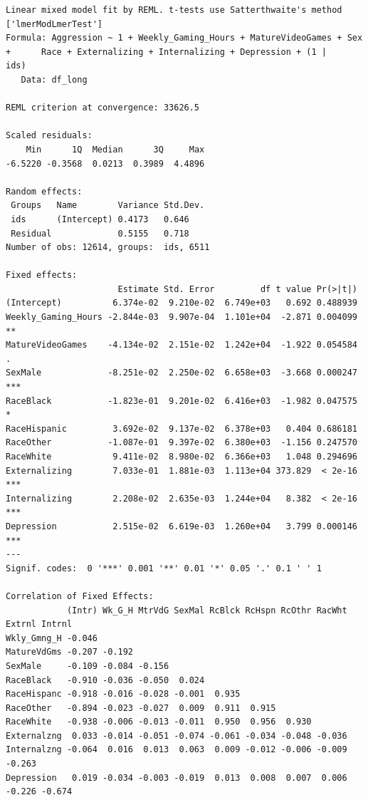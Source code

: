 \documentclass{article}
\begin{document}
\begin{verbatim}
Linear mixed model fit by REML. t-tests use Satterthwaite's method ['lmerModLmerTest']
Formula: Aggression ~ 1 + Weekly_Gaming_Hours + MatureVideoGames + Sex +      Race + Externalizing + Internalizing + Depression + (1 |      ids)
   Data: df_long

REML criterion at convergence: 33626.5

Scaled residuals: 
    Min      1Q  Median      3Q     Max 
-6.5220 -0.3568  0.0213  0.3989  4.4896 

Random effects:
 Groups   Name        Variance Std.Dev.
 ids      (Intercept) 0.4173   0.646   
 Residual             0.5155   0.718   
Number of obs: 12614, groups:  ids, 6511

Fixed effects:
                      Estimate Std. Error         df t value Pr(>|t|)    
(Intercept)          6.374e-02  9.210e-02  6.749e+03   0.692 0.488939    
Weekly_Gaming_Hours -2.844e-03  9.907e-04  1.101e+04  -2.871 0.004099 ** 
MatureVideoGames    -4.134e-02  2.151e-02  1.242e+04  -1.922 0.054584 .  
SexMale             -8.251e-02  2.250e-02  6.658e+03  -3.668 0.000247 ***
RaceBlack           -1.823e-01  9.201e-02  6.416e+03  -1.982 0.047575 *  
RaceHispanic         3.692e-02  9.137e-02  6.378e+03   0.404 0.686181    
RaceOther           -1.087e-01  9.397e-02  6.380e+03  -1.156 0.247570    
RaceWhite            9.411e-02  8.980e-02  6.366e+03   1.048 0.294696    
Externalizing        7.033e-01  1.881e-03  1.113e+04 373.829  < 2e-16 ***
Internalizing        2.208e-02  2.635e-03  1.244e+04   8.382  < 2e-16 ***
Depression           2.515e-02  6.619e-03  1.260e+04   3.799 0.000146 ***
---
Signif. codes:  0 '***' 0.001 '**' 0.01 '*' 0.05 '.' 0.1 ' ' 1

Correlation of Fixed Effects:
            (Intr) Wk_G_H MtrVdG SexMal RcBlck RcHspn RcOthr RacWht Extrnl Intrnl
Wkly_Gmng_H -0.046                                                               
MatureVdGms -0.207 -0.192                                                        
SexMale     -0.109 -0.084 -0.156                                                 
RaceBlack   -0.910 -0.036 -0.050  0.024                                          
RaceHispanc -0.918 -0.016 -0.028 -0.001  0.935                                   
RaceOther   -0.894 -0.023 -0.027  0.009  0.911  0.915                            
RaceWhite   -0.938 -0.006 -0.013 -0.011  0.950  0.956  0.930                     
Externalzng  0.033 -0.014 -0.051 -0.074 -0.061 -0.034 -0.048 -0.036              
Internalzng -0.064  0.016  0.013  0.063  0.009 -0.012 -0.006 -0.009 -0.263       
Depression   0.019 -0.034 -0.003 -0.019  0.013  0.008  0.007  0.006 -0.226 -0.674
\end{verbatim}
\end{document}
